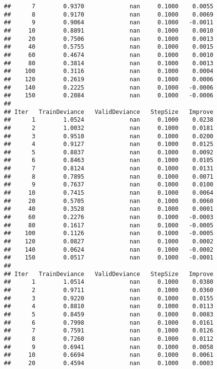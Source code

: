 \documentclass[]{article}
\begin{document}
\begin{verbatim}
##      7        0.9370             nan     0.1000    0.0055
##      8        0.9170             nan     0.1000    0.0069
##      9        0.9064             nan     0.1000   -0.0011
##     10        0.8891             nan     0.1000    0.0010
##     20        0.7506             nan     0.1000    0.0013
##     40        0.5755             nan     0.1000    0.0015
##     60        0.4674             nan     0.1000    0.0010
##     80        0.3814             nan     0.1000    0.0013
##    100        0.3116             nan     0.1000    0.0004
##    120        0.2619             nan     0.1000    0.0006
##    140        0.2225             nan     0.1000   -0.0006
##    150        0.2084             nan     0.1000   -0.0006
## 
## Iter   TrainDeviance   ValidDeviance   StepSize   Improve
##      1        1.0524             nan     0.1000    0.0238
##      2        1.0032             nan     0.1000    0.0181
##      3        0.9510             nan     0.1000    0.0200
##      4        0.9127             nan     0.1000    0.0125
##      5        0.8837             nan     0.1000    0.0092
##      6        0.8463             nan     0.1000    0.0105
##      7        0.8124             nan     0.1000    0.0131
##      8        0.7895             nan     0.1000    0.0071
##      9        0.7637             nan     0.1000    0.0100
##     10        0.7415             nan     0.1000    0.0064
##     20        0.5705             nan     0.1000    0.0060
##     40        0.3528             nan     0.1000    0.0001
##     60        0.2276             nan     0.1000   -0.0003
##     80        0.1617             nan     0.1000   -0.0005
##    100        0.1126             nan     0.1000   -0.0005
##    120        0.0827             nan     0.1000    0.0002
##    140        0.0624             nan     0.1000   -0.0002
##    150        0.0517             nan     0.1000   -0.0001
## 
## Iter   TrainDeviance   ValidDeviance   StepSize   Improve
##      1        1.0514             nan     0.1000    0.0380
##      2        0.9711             nan     0.1000    0.0360
##      3        0.9220             nan     0.1000    0.0155
##      4        0.8810             nan     0.1000    0.0113
##      5        0.8459             nan     0.1000    0.0083
##      6        0.7998             nan     0.1000    0.0161
##      7        0.7591             nan     0.1000    0.0126
##      8        0.7260             nan     0.1000    0.0112
##      9        0.6941             nan     0.1000    0.0058
##     10        0.6694             nan     0.1000    0.0061
##     20        0.4594             nan     0.1000    0.0003

\end{verbatim}
\end{document}
